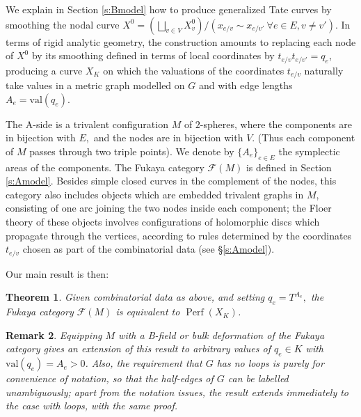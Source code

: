 \documentclass[11pt,leqno]{amsart}
\newtheorem{theo}{Theorem}[section]
\newtheorem{remark}[theo]{Remark}
\numberwithin{equation}{section}
\def\val{\mathrm{val}}
\def\F{{\mathcal F}}
\newcommand{\Perf}{\operatorname{Perf}}
\begin{document}
We explain in Section \ref{s:Bmodel} how to produce generalized
Tate curves by smoothing the nodal curve
$X^0=\left(\bigsqcup_{v \in V} X^0_v\right)/(x_{e/v}\sim x_{e/v'}\ \forall
e\in E, v\neq v')$. In terms of rigid analytic geometry, the construction amounts to replacing 
each node of $X^0$ by its smoothing defined in terms of local coordinates
by $t_{e/v}t_{e/v'}=q_e$, producing a curve $X_K$ on which the valuations of the 
coordinates $t_{e/v}$ naturally take values in a metric graph modelled on
$G$ and with edge lengths $A_e=\val(q_e)$.

The A-side is a trivalent configuration $M$ of $2$-spheres, where the
components are in bijection with $E,$ and the nodes are in bijection with 
$V.$ (Thus each component of $M$ passes through two triple points).
We denote by $\{A_e\}_{e\in E}$ the symplectic areas of the components.
The Fukaya category $\F(M)$ is defined in Section \ref{s:Amodel}. 
Besides simple closed curves in the complement of the nodes, this
category also includes objects which are embedded trivalent
graphs in $M$, consisting of one arc joining the two nodes inside each 
component; the Floer theory of these objects involves configurations of
holomorphic discs which propagate through the vertices, according to rules
determined by the coordinates $t_{e/v}$ chosen as part of the combinatorial
data (see \S \ref{s:Amodel}).

Our main result is then:

\begin{theo}\label{thm:main}
Given combinatorial data as above, and setting $q_{e}=T^{A_{e}},$ the 
Fukaya category $\F(M)$ is equivalent to $\Perf(X_K)$.
\end{theo}

\begin{remark}\label{rmk:main}
Equipping $M$ with a B-field or {\em bulk deformation} of the
Fukaya category gives an extension of this result to arbitrary values of
$q_e\in K$ with $\val(q_e)=A_e>0$.
Also, the requirement that $G$ has no loops is purely for convenience
of notation, so that the half-edges of $G$ can be labelled unambiguously;
apart from the notation issues, the result extends immediately to the case
with loops, with the same proof.
\end{remark}
\end{document}
